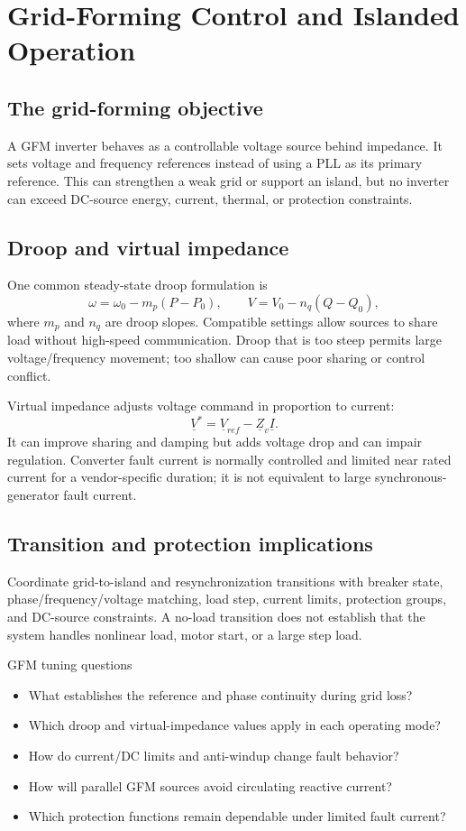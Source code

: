 \documentclass[11pt]{article}
\begin{document}
\section{Grid-Forming Control and Islanded Operation}

\subsection{The grid-forming objective}
A GFM inverter behaves as a controllable voltage source behind impedance. It
sets voltage and frequency references instead of using a PLL as its primary
reference. This can strengthen a weak grid or support an island, but no inverter
can exceed DC-source energy, current, thermal, or protection constraints.

\subsection{Droop and virtual impedance}
One common steady-state droop formulation is
\[
\omega=\omega_0-m_p(P-P_0),\qquad V=V_0-n_q(Q-Q_0),
\]
where $m_p$ and $n_q$ are droop slopes. Compatible settings allow sources to
share load without high-speed communication. Droop that is too steep permits
large voltage/frequency movement; too shallow can cause poor sharing or control
conflict.

Virtual impedance adjusts voltage command in proportion to current:
\[
\underline V^*=\underline V_{ref}-\underline Z_v\underline I.
\]
It can improve sharing and damping but adds voltage drop and can impair
regulation. Converter fault current is normally controlled and limited near
rated current for a vendor-specific duration; it is not equivalent to large
synchronous-generator fault current.

\subsection{Transition and protection implications}
Coordinate grid-to-island and resynchronization transitions with breaker state,
phase/frequency/voltage matching, load step, current limits, protection groups,
and DC-source constraints. A no-load transition does not establish that the
system handles nonlinear load, motor start, or a large step load.

\begin{checklistbox}{GFM tuning questions}
\begin{itemize}
\item What establishes the reference and phase continuity during grid loss?
\item Which droop and virtual-impedance values apply in each operating mode?
\item How do current/DC limits and anti-windup change fault behavior?
\item How will parallel GFM sources avoid circulating reactive current?
\item Which protection functions remain dependable under limited fault current?
\end{itemize}
\end{checklistbox}
\end{document}

